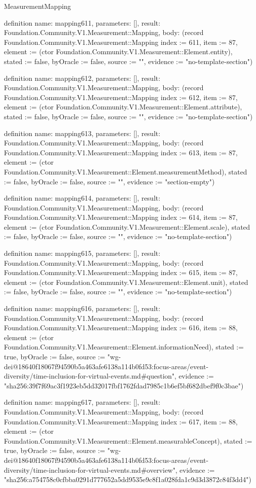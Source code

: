 \begin{lexlean}{MeasurementMapping}
\begin{semanticmodule}
definition{
  name: mapping611,
  parameters: [],
  result: Foundation.Community.V1.Measurement::Mapping,
  body: (record Foundation.Community.V1.Measurement::Mapping {index := 611, item := 87, element := (ctor Foundation.Community.V1.Measurement::Element.entity), stated := false, byOracle := false, source := "", evidence := "no-template-section"})
}

definition{
  name: mapping612,
  parameters: [],
  result: Foundation.Community.V1.Measurement::Mapping,
  body: (record Foundation.Community.V1.Measurement::Mapping {index := 612, item := 87, element := (ctor Foundation.Community.V1.Measurement::Element.attribute), stated := false, byOracle := false, source := "", evidence := "no-template-section"})
}

definition{
  name: mapping613,
  parameters: [],
  result: Foundation.Community.V1.Measurement::Mapping,
  body: (record Foundation.Community.V1.Measurement::Mapping {index := 613, item := 87, element := (ctor Foundation.Community.V1.Measurement::Element.measurementMethod), stated := false, byOracle := false, source := "", evidence := "section-empty"})
}

definition{
  name: mapping614,
  parameters: [],
  result: Foundation.Community.V1.Measurement::Mapping,
  body: (record Foundation.Community.V1.Measurement::Mapping {index := 614, item := 87, element := (ctor Foundation.Community.V1.Measurement::Element.scale), stated := false, byOracle := false, source := "", evidence := "no-template-section"})
}

definition{
  name: mapping615,
  parameters: [],
  result: Foundation.Community.V1.Measurement::Mapping,
  body: (record Foundation.Community.V1.Measurement::Mapping {index := 615, item := 87, element := (ctor Foundation.Community.V1.Measurement::Element.unit), stated := false, byOracle := false, source := "", evidence := "no-template-section"})
}

definition{
  name: mapping616,
  parameters: [],
  result: Foundation.Community.V1.Measurement::Mapping,
  body: (record Foundation.Community.V1.Measurement::Mapping {index := 616, item := 88, element := (ctor Foundation.Community.V1.Measurement::Element.informationNeed), stated := true, byOracle := false, source := "wg-dei@18640f18067f94590b5a463afe6138a114b0fd53:focus-areas/event-diversity/time-inclusion-for-virtual-events.md#question", evidence := "sha256:39f7f69ac3f1923eb5dd32017fbf1762fdad7985c1b6ef5bf682dbef9f0c3bae"})
}

definition{
  name: mapping617,
  parameters: [],
  result: Foundation.Community.V1.Measurement::Mapping,
  body: (record Foundation.Community.V1.Measurement::Mapping {index := 617, item := 88, element := (ctor Foundation.Community.V1.Measurement::Element.measurableConcept), stated := true, byOracle := false, source := "wg-dei@18640f18067f94590b5a463afe6138a114b0fd53:focus-areas/event-diversity/time-inclusion-for-virtual-events.md#overview", evidence := "sha256:a754758c0cfbba0291d777652a5dd9535e9c8f1a028fda1c9d3d3872c84f3dd4"})
}


\end{semanticmodule}
\end{lexlean}
